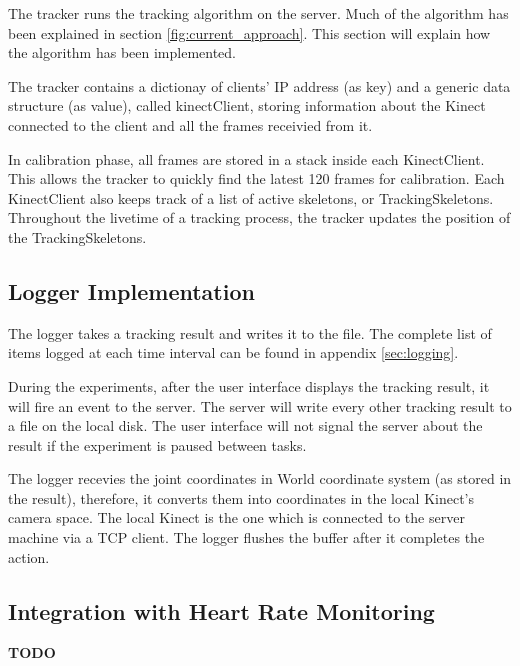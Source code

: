 The tracker runs the tracking algorithm on the server. Much of the algorithm has been explained in section \ref{fig:current_approach}. This section will explain how the algorithm has been implemented.

The tracker contains a dictionay of clients' IP address (as key) and a generic data structure (as value), called kinectClient, storing information about the Kinect connected to the client and all the frames receivied from it.

In calibration phase, all frames are stored in a stack inside each KinectClient. This allows the tracker to quickly find the latest 120 frames for calibration. Each KinectClient also keeps track of a list of active skeletons, or TrackingSkeletons. Throughout the livetime of a tracking process, the tracker updates the position of the TrackingSkeletons.

\subsection{Logger Implementation}

The logger takes a tracking result and writes it to the file. The complete list of items logged at each time interval can be found in appendix \ref{sec:logging}.

During the experiments, after the user interface displays the tracking result, it will fire an event to the server. The server will write every other tracking result to a file on the local disk. The user interface will not signal the server about the result if the experiment is paused between tasks.

The logger recevies the joint coordinates in World coordinate system (as stored in the result), therefore, it converts them into coordinates in the local Kinect's camera space. The local Kinect is the one which is connected to the server machine via a TCP client. The logger flushes the buffer after it completes the action.

\subsection{Integration with Heart Rate Monitoring}

\textbf{TODO}
